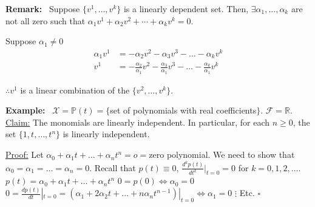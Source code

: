 \documentclass[letterpaper]{article}
\begin{document}
\noindent \textbf{Remark:}~ Suppose $\{v^1, \dots, v^k\}$ is a linearly dependent set. Then, $\exists\alpha_1, \dots, \alpha_k$ are not all zero such that $\alpha_1v^1+\alpha_2v^2+\dotsb+\alpha_kv^k=0$.

Suppose $\alpha_1\neq0$
    \begin{align*}
    \alpha_1v^1 &= -\alpha_2v^2-\alpha_3v^3-\dots-\alpha_kv^k\\
    v^1 &= -\frac{\alpha_2}{\alpha_1}v^2-\frac{\alpha_3}{\alpha_1}v^3-\dots-\frac{\alpha_k}{\alpha_1}v^k
    \end{align*}

$\therefore v^1$ is a linear combination of the $\{v^2,\dots,v^k\}$.

\noindent \textbf{Example:}~ $\mathcal{X}=\mathbb{P}(t)=\{$set of polynomials with real coefficients$\}$. $\mathcal{F}=\mathbb{R}$.
    \underline{Claim:} The monomials are linearly independent. In particular, for each $n\geq 0$, the set $\{1,t,\dots,t^n\}$ is linearly independent.

    \underline{Proof:} Let $\alpha_0+\alpha_1t+\dots+\alpha_nt^n=o=$zero polynomial. We need to show that $\alpha_0=\alpha_1=\dots=\alpha_n=0$.
        \newline Recall that $p(t)\equiv0$, $\frac{d^kp(t)}{dt^k}|_{t=0}=0$ for $k=0,1,2,\dots$.
        \newline
        $p(t)=\alpha_0+\alpha_1t+\dots+\alpha_nt^n$
        \newline
        $0=p(0)\iff\alpha_0=0$
        \newline
        $0=\frac{dp(t)}{dt}|_{t=0}=(\alpha_1+2\alpha_2t+\dots+n\alpha_nt^{n-1})|_{t=0}\iff\alpha_1=0$
        \newline
        $\vdots$
        \newline
        Etc. $\square$
\end{document}
